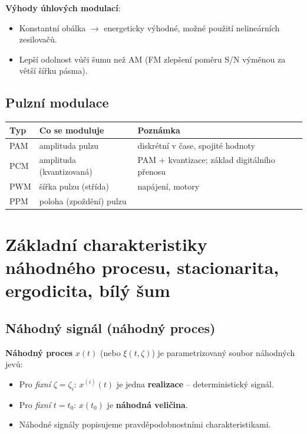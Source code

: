 \documentclass[12pt,a4paper]{article}
\begin{document}
\textbf{Výhody úhlových modulací}:
\begin{itemize}
  \item Konstantní obálka $\to$ energeticky výhodné, možné použití nelineárních zesilovačů.
  \item Lepší odolnost vůči šumu než AM (FM zlepšení poměru S/N výměnou za větší šířku pásma).
\end{itemize}

\subsection*{Pulzní modulace}

\begin{center}
\begin{tabular}{lll}
\toprule
\textbf{Typ} & \textbf{Co se moduluje} & \textbf{Poznámka} \\
\midrule
PAM & amplituda pulzu & diskrétní v čase, spojité hodnoty \\
PCM & amplituda (kvantizovaná) & PAM + kvantizace; základ digitálního přenosu \\
PWM & šířka pulzu (střída) & napájení, motory \\
PPM & poloha (zpoždění) pulzu & \\
\bottomrule
\end{tabular}
\end{center}

\newpage
\section{Základní charakteristiky náhodného procesu, stacionarita, ergodicita, bílý šum}

\begin{hvezdBox}
\subsection*{Náhodný signál (náhodný proces)}
\end{hvezdBox}

\textbf{Náhodný proces} $x(t)$ (nebo $\xi(t, \zeta)$) je parametrizovaný soubor náhodných jevů:
\begin{itemize}
  \item Pro \emph{fixní} $\zeta = \zeta_i$: $x^{(i)}(t)$ je jedna \textbf{realizace} – deterministický signál.
  \item Pro \emph{fixní} $t = t_0$: $x(t_0)$ je \textbf{náhodná veličina}.
  \item Náhodné signály popisujeme pravděpodobnostními charakteristikami.
\end{itemize}
\end{document}
